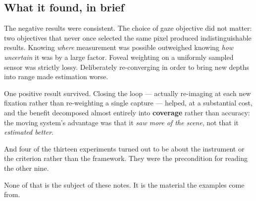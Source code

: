 \subsection{What it found, in brief}

The negative results were consistent. The choice of gaze objective did not matter: two objectives that never once selected the same pixel produced indistinguishable results. Knowing \textit{where} measurement was possible outweighed knowing \textit{how uncertain} it was by a large factor. Foveal weighting on a uniformly sampled sensor was strictly lossy. Deliberately re-converging in order to bring new depths into range made estimation worse.

One positive result survived. Closing the loop --- actually re-imaging at each new fixation rather than re-weighting a single capture --- helped, at a substantial cost, and the benefit decomposed almost entirely into \textbf{coverage} rather than accuracy: the moving system's advantage was that it \textit{saw more of the scene}, not that it \textit{estimated better}.

And four of the thirteen experiments turned out to be about the instrument or the criterion rather than the framework. They were the precondition for reading the other nine.

None of that is the subject of these notes. It is the material the examples come from.
